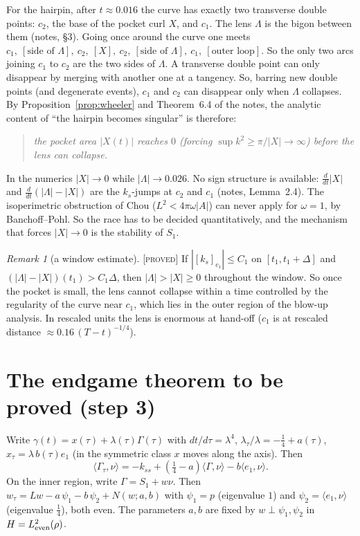 \documentclass[11pt]{amsart}
\theoremstyle{remark}
\newtheorem{remark}[theorem]{Remark}
\newcommand{\ip}[2]{\langle #1,#2\rangle}
\newcommand{\lab}[1]{\textup{\textsc{[#1]}}}
\begin{document}
For the hairpin, after $t\approx0.016$ the curve has exactly two transverse double points: $c_2$, the base of the pocket curl $X$, and $c_1$. The lens $\Lambda$ is the bigon between them (notes, \S3). Going once around the curve one meets $c_1,\ [\text{side of }\Lambda],\ c_2,\ [X],\ c_2,\ [\text{side of }\Lambda],\ c_1,\ [\text{outer loop}]$. So the only two arcs joining $c_1$ to $c_2$ are the two sides of $\Lambda$. A transverse double point can only disappear by merging with another one at a tangency. So, barring new double points (and degenerate events), $c_1$ and $c_2$ can disappear only when $\Lambda$ collapses. By Proposition~\ref{prop:wheeler} and Theorem~6.4 of the notes, the analytic content of ``the hairpin becomes singular'' is therefore:
\begin{quote}
\emph{the pocket area $|X(t)|$ reaches $0$ (forcing $\sup k^2\ge\pi/|X|\to\infty$) before the lens can collapse.}
\end{quote}
In the numerics $|X|\to0$ while $|\Lambda|\to0.026$. No sign structure is available: $\frac{d}{dt}|X|$ and $\frac{d}{dt}(|\Lambda|-|X|)$ are the $k_s$-jumps at $c_2$ and $c_1$ (notes, Lemma~2.4). The isoperimetric obstruction of Chou ($L^2<4\pi\omega|A|$) can never apply for $\omega=1$, by Banchoff--Pohl. So the race has to be decided quantitatively, and the mechanism that forces $|X|\to0$ is the stability of $S_1$.

\begin{remark}[a window estimate]\lab{proved}
If $|[k_s]_{c_1}|\le C_1$ on $[t_1,t_1+\Delta]$ and $(|\Lambda|-|X|)(t_1)>C_1\Delta$, then $|\Lambda|>|X|\ge0$ throughout the window. So once the pocket is small, the lens cannot collapse within a time controlled by the regularity of the curve near $c_1$, which lies in the outer region of the blow-up analysis. In rescaled units the lens is enormous at hand-off ($c_1$ is at rescaled distance $\approx0.16\,(T-t)^{-1/4}$).
\end{remark}

\section{The endgame theorem to be proved (step 3)}

Write $\gamma(t)=x(\tau)+\lambda(\tau)\Gamma(\tau)$ with $dt/d\tau=\lambda^4$, $\lambda_\tau/\lambda=-\frac14+a(\tau)$, $x_\tau=\lambda\,b(\tau)e_1$ (in the symmetric class $x$ moves along the axis). Then
\[
\ip{\Gamma_\tau}{\nu}=-k_{ss}+(\tfrac14-a)\ip{\Gamma}{\nu}-b\ip{e_1}{\nu}.
\]
On the inner region, write $\Gamma=S_1+w\nu$. Then $w_\tau=Lw-a\,\psi_1-b\,\psi_2+N(w;a,b)$ with $\psi_1=p$ (eigenvalue $1$) and $\psi_2=\ip{e_1}{\nu}$ (eigenvalue $\frac14$), both even. The parameters $a,b$ are fixed by $w\perp\psi_1,\psi_2$ in $H=L^2_{\rm even}(\rho)$.
\end{document}
